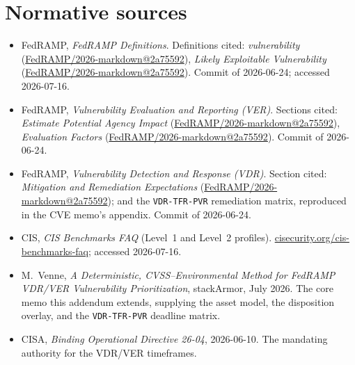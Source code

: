 \documentclass[11pt]{article}
\makeatletter
\newcommand{\code}[1]{\texttt{#1}}
\newcommand{\fedbase}{https://github.com/FedRAMP/2026-markdown/blob/2a75592f0e1f86a48b2888d29af6c570c419a7a5}
\newcommand{\defvulncite}{\href{\fedbase/definitions.md\#vulnerability}{FedRAMP/2026-markdown@2a75592}}
\newcommand{\deflevcite}{\href{\fedbase/definitions.md\#likely-exploitable-vulnerability-lev}{FedRAMP/2026-markdown@2a75592}}
\newcommand{\verpaincite}{\href{\fedbase/providers/rev5/rules/vulnerability-evaluation-and-reporting.md\#estimate-potential-agency-impact}{FedRAMP/2026-markdown@2a75592}}
\newcommand{\verfactcite}{\href{\fedbase/providers/rev5/rules/vulnerability-evaluation-and-reporting.md\#evaluation-factors}{FedRAMP/2026-markdown@2a75592}}
\newcommand{\vdrmitcite}{\href{\fedbase/providers/rev5/rules/vulnerability-detection-and-response.md\#mitigation-and-remediation-expectations}{FedRAMP/2026-markdown@2a75592}}
\newcommand{\ciscite}{\href{https://www.cisecurity.org/cis-benchmarks/cis-benchmarks-faq}{cisecurity.org/cis-benchmarks-faq}}
\makeatother
\begin{document}
\section*{Normative sources}
\begingroup\sloppy
\begin{itemize}[leftmargin=3.4em]
\item[{[DEF]}] FedRAMP, \emph{FedRAMP Definitions}. Definitions cited:
  \emph{vulnerability} (\defvulncite{}), \emph{Likely Exploitable Vulnerability}
  (\deflevcite{}). Commit of 2026-06-24; accessed 2026-07-16.
\item[{[VER]}] FedRAMP, \emph{Vulnerability Evaluation and Reporting (VER)}.
  Sections cited: \emph{Estimate Potential Agency Impact} (\verpaincite{}),
  \emph{Evaluation Factors} (\verfactcite{}). Commit of 2026-06-24.
\item[{[VDR]}] FedRAMP, \emph{Vulnerability Detection and Response (VDR)}.
  Section cited: \emph{Mitigation and Remediation Expectations} (\vdrmitcite{}); and
  the \code{VDR-TFR-PVR} remediation matrix, reproduced in the CVE memo's appendix.
  Commit of 2026-06-24.
\item[{[CIS]}] CIS, \emph{CIS Benchmarks FAQ} (Level~1 and Level~2 profiles).
  \ciscite{}; accessed 2026-07-16.
\item[{[CVEM]}] M.~Venne, \emph{A Deterministic, CVSS--Environmental Method for
  FedRAMP VDR/VER Vulnerability Prioritization}, stackArmor, July 2026. The core
  memo this addendum extends, supplying the asset model, the disposition overlay, and the \code{VDR-TFR-PVR}
  deadline matrix.
\item[{[BOD]}] CISA, \emph{Binding Operational Directive 26-04}, 2026-06-10. The
  mandating authority for the VDR/VER timeframes.
\end{itemize}
\endgroup
\end{document}
